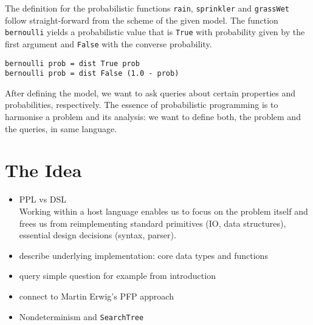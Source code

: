 \documentclass[
12pt, %
a4paper, %
oneside, %
]{llncs}
\newcommand{\code}[1]{{\texttt{#1}}}
\begin{document}
The definition for the probabilistic functions \code{rain},
\code{sprinkler} and \code{grassWet} follow straight-forward from the
scheme of the given model. %
The function \code{bernoulli} yields a probabilistic value that is
\code{True} with probability given by the first argument and
\code{False} with the converse probability. %

\begin{verbatim}
bernoulli prob = dist True prob
bernoulli prob = dist False (1.0 - prob)
\end{verbatim}

After defining the model, we want to ask queries about certain
properties and probabilities, respectively. %
The essence of probabilistic programming is to harmonise a problem and
its analysis: we want to define both, the problem and the queries, in
same language. %

\section{The Idea}

\begin{itemize}
\item PPL vs DSL\\
  Working within a host language enables us to focus on the
  problem itself and frees us from reimplementing standard primitives
  (IO, data structures), essential design decisions (syntax,
  parser). %
\item describe underlying implementation: core data types and
  functions
\item query simple question for example from introduction
\item connect to Martin Erwig's PFP approach
\item Nondeterminism and \code{SearchTree}
\end{itemize}
\end{document}
